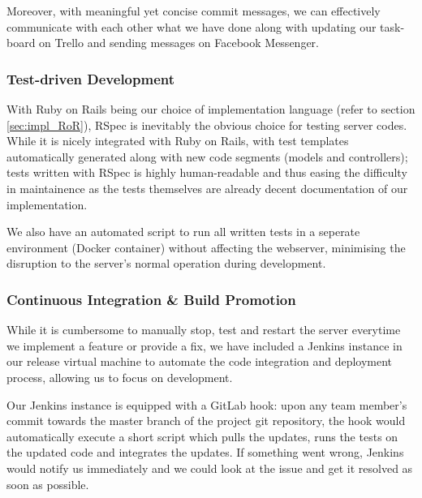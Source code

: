 \documentclass[a4paper, titlepage]{article}
\begin{document}
Moreover, with meaningful yet concise commit messages, we can effectively
communicate with each other what we have done along with updating our task-board
on Trello and sending messages on Facebook Messenger.


\subsubsection{Test-driven Development} \label{sec:projman_tdd}
With Ruby on Rails being our choice of implementation language (refer to section \ref{sec:impl_RoR}),
RSpec is inevitably the obvious choice for testing server codes.
While it is nicely integrated with Ruby on Rails, with test templates automatically
generated along with new code segments (models and controllers);
tests written with RSpec is highly human-readable and thus
easing the difficulty in maintainence as the tests themselves are already
decent documentation of our implementation.

We also have an automated script to run all written tests in a seperate
environment (Docker container) without affecting the webserver, minimising
the disruption to the server's normal operation during development.



\subsubsection{Continuous Integration \& Build Promotion}

While it is cumbersome to manually stop, test and restart the server
everytime we implement a feature or provide a fix, we have
included a Jenkins instance in our release virtual machine to automate
the code integration and deployment process, allowing us to focus on
development.

Our Jenkins instance is equipped with a GitLab hook: upon any team member's
commit towards the master branch of the project git repository, the hook would
automatically execute a short script which pulls the updates, runs the tests
on the updated code and integrates the updates. If something went wrong,
Jenkins would notify us immediately and we could look at the issue and get
it resolved as soon as possible.
\end{document}
